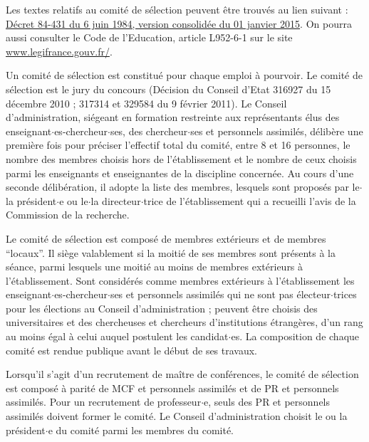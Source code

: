 Les textes relatifs au comit\'e de s\'election peuvent \^etre trouv\'es au lien suivant :
\href{http://www.legifrance.gouv.fr/affichTexte.do;jsessionid=E1D1583A8C612508D9955CAB27DB96E0.tpdjo12v_3&dateTexte%
=?cidTexte=JORFTEXT000000520453&categorieLien=cid}{D\'ecret 84-431 du 6 juin 1984, version consolid\'ee du 01 janvier 2015}. 
On pourra aussi consulter le Code de l'Education, article L952-6-1 sur le
site \url{www.legifrance.gouv.fr/}.


Un comit\'e de s\'election est constitu\'e pour chaque emploi \`a pourvoir. Le comit\'e de s\'election est le jury du concours 
(D\'ecision du Conseil d'Etat 316927 du 15 d\'ecembre 2010 ; 317314 et 329584 du 9 f\'evrier 2011). 
Le Conseil d'administration, si\'egeant en formation
restreinte aux repr\'esentants \'elus des enseignant$\cdot$es-chercheur$\cdot$ses, des chercheur$\cdot$ses et personnels assimil\'es, d\'elib\`ere
une premi\`ere fois pour pr\'eciser l'effectif total du comit\'e, entre 8 et 16 personnes, le nombre des membres choisis hors de
l'\'etablissement et le nombre de ceux choisis parmi les enseignants et enseignantes de la discipline concern\'ee. Au cours d'une
seconde d\'elib\'eration, il adopte la liste des membres, lesquels sont propos\'es par le$\cdot$la pr\'esident$\cdot$e ou le$\cdot$la directeur$\cdot$trice de
l'\'etablissement qui a recueilli l'avis de la Commission de la recherche.

Le comit\'e de s\'election est compos\'e de membres ext\'erieurs et de membres ``locaux''. Il si\`ege valablement si la moiti\'e de ses membres sont pr\'esents \`a la s\'eance, parmi lesquels une moiti\'e au moins de membres ext\'erieurs \`a l'\'etablissement. Sont consid\'er\'es comme membres ext\'erieurs \`a l'\'etablissement les enseignant$\cdot$es-chercheur$\cdot$ses et personnels assimil\'es qui ne sont pas \'electeur$\cdot$trices pour les \'elections
au Conseil d'administration ; peuvent \^etre choisis des universitaires et des chercheuses et chercheurs d'institutions \'etrang\`eres,
d'un rang au moins \'egal \`a celui auquel postulent les candidat$\cdot$es. La composition de chaque comit\'e est rendue
publique avant le d\'ebut de ses travaux.

Lorsqu'il s'agit d'un recrutement de ma\^itre de conf\'erences, le comit\'e de s\'election est compos\'e \`a parit\'e de MCF
et personnels assimil\'es et de PR et personnels assimil\'es. Pour un recrutement de professeur$\cdot$e, seuls des PR et
personnels assimil\'es doivent former le comit\'e. Le Conseil d'administration choisit le ou la pr\'esident$\cdot$e du comit\'e parmi les
membres du comit\'e.

